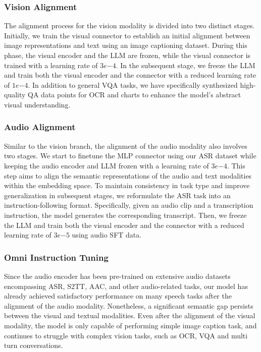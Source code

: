 \subsubsection{Vision Alignment}

The alignment process for the vision modality is divided into two distinct stages. Initially, we train the visual connector to establish an initial alignment between image representations and text using an image captioning dataset. During this phase, the visual encoder and the LLM are frozen, while the visual connector is trained with a learning rate of \(3e{-4}\). In the subsequent stage, we freeze the LLM and train both the visual encoder and the connector with a reduced learning rate of \(1e{-4}\). In addition to general VQA tasks, we have specifically synthesized high-quality QA data points for OCR and charts to enhance the model's abstract visual understanding. 



\subsubsection{Audio Alignment}
Similar to the vision branch, the alignment of the audio modality also involves two stages. We start to finetune the MLP connector using our ASR dataset while keeping the audio encoder and LLM frozen with a learning rate of \(3e{-4}\). This step aims to align the semantic representations of the audio and text modalities within the embedding space. To maintain consistency in task type and improve generalization in subsequent stages, we reformulate the ASR task into an instruction-following format. Specifically, given an audio clip and a transcription instruction, the model generates the corresponding transcript. Then, we freeze the LLM and train both the visual encoder and the connector with a reduced learning rate of \(3e{-5}\) using audio SFT data. 

\subsubsection{Omni Instruction Tuning}

Since the audio encoder has been pre-trained on extensive audio datasets encompassing ASR, S2TT, AAC, and other audio-related tasks, our model has already achieved satisfactory performance on many speech tasks after the alignment of the audio modality. Nonetheless, a significant semantic gap persists between the visual and textual modalities. Even after the alignment of the visual modality, the model is only capable of performing simple image caption task, and continues to struggle with complex vision tasks, such as OCR, VQA and multi turn conversations.

